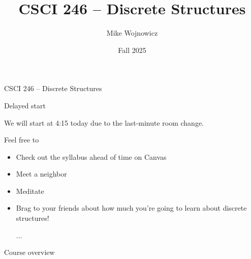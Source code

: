 \documentclass[10pt]{beamer}
\begin{document}
\title{CSCI 246 -- Discrete Structures} 
\author{Mike Wojnowicz}


\date{Fall 2025}{}




\renewcommand{\insertframenumber}{}


\begin{frame}[plain,label=title-page, noframenumbering ]
  \titlepage
\end{frame}



\begin{frame}{CSCI 246 -- Discrete Structures}

 \begin{block}{Delayed start}
 
We will start at 4:15 today due to the last-minute room change.

\vspace{0.2cm}

Feel free to 
\begin{itemize}
\item Check out the syllabus ahead of time on Canvas
\item Meet a neighbor
\item Meditate
\item Brag to your friends about how much you're going to learn about discrete structures!	
\item [...]
\end{itemize}

\end{block}
	
\end{frame}




\begin{frame}[standout]
Course overview 
\end{frame}
\end{document}
